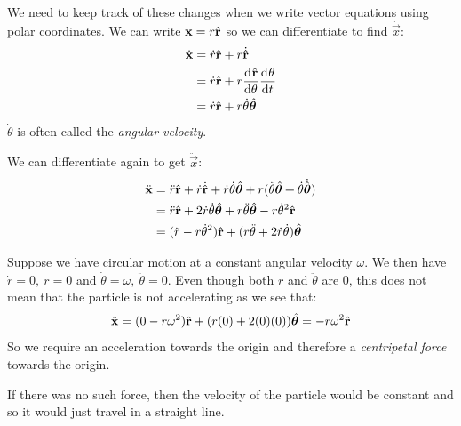 \documentclass[../main.tex]{subfiles}
\begin{document}
We need to keep track of these changes when we write vector equations using polar coordinates.
We can write $\mathbf{\bm{x}} = r \hat{\mathbf{\bm{r}}}$ so we can differentiate to find $\ddot{\vec{x}}$:
\begin{align*}
  \dot{\vec{x}} &= \dot{r} \uvec{r} + r \dot{\uvec{r}} \\
                &= \dot{r} \uvec{r} + r \deriv{\uvec{r}}{\theta} \deriv{\theta}{t} \\
                &= \dot{r} \uvec{r} + r \dot{\theta} \uvec{\theta}
\end{align*}
$\dot{\theta}$ is often called the \textit{angular velocity}.

We can differentiate again to get $\ddot{\vec{x}}$:
\begin{align*}
  \ddot{\mathbf{\bm{x}}} &= \ddot{r} \hat{\mathbf{\bm{r}}} + \dot{r}\dot{\hat{\mathbf{\bm{r}}}} + \dot{r} \dot{\theta} \hat{\mathbf{\bm{\theta}}} + r(\ddot{\theta}\hat{\mathbf{\bm{\theta}}} + \dot{\theta}\dot{\hat{\mathbf{\bm{\theta}}}}) \\
                 &= \ddot{r} \hat{\mathbf{\bm{r}}} + 2 \dot{r} \dot{\theta} \hat{\mathbf{\bm{\theta}}} + r \ddot{\theta} \hat{\mathbf{\bm{\theta}}} - r \dot{\theta}^2 \hat{\mathbf{\bm{r}}} \\
                 &= (\ddot{r} - r \dot{\theta}^2)\hat{\mathbf{\bm{r}}} + (r \ddot{\theta}  + 2\dot{r} \dot{\theta}) \hat{\mathbf{\bm{\theta}}}
\end{align*}
\begin{example}
  Suppose we have circular motion at a constant angular velocity $\omega$.
  We then have $\dot{r} = 0,\ \ddot{r} = 0$ and $\dot{\theta} = \omega,\ \ddot{\theta} = 0$.
  Even though both $\ddot{r}$ and $\ddot{\theta}$ are 0, this does not mean that the particle is not accelerating as we see that:
  \[
    \ddot{\mathbf{\bm{x}}} = (0 - r\omega^2)\hat{\mathbf{\bm{r}}} + (r(0) + 2(0)(0))\hat{\mathbf{\bm{\theta}}} =  -r \omega^2 \hat{\mathbf{\bm{r}}}
  \]
  So we require an acceleration towards the origin and therefore a \textit{centripetal force} towards the origin.
  \begin{center}
  \end{center}
  If there was no such force, then the velocity of the particle would be constant and so it would just travel in a straight line.
\end{example}
\end{document}
